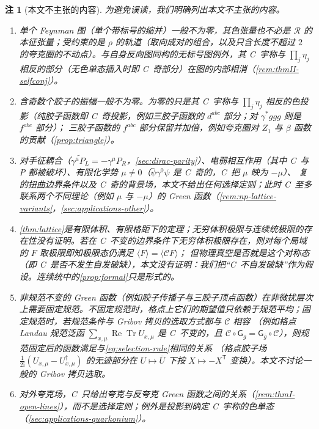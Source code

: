 \documentclass[UTF8,a4paper,11pt,fontset=fandol]{ctexart}
\theoremstyle{cplain}
\theoremstyle{cdefinition}
\theoremstyle{cremark}
\newtheorem{remark}[theorem]{注}
\numberwithin{equation}{section}
\DeclareMathOperator{\Tr}{Tr}
\DeclareMathOperator{\Real}{Re}
\newcommand{\tp}{\mathsf{T}}                         %
\newcommand{\Cop}{\mathcal{C}}                       %
\newcommand{\Rop}{\mathcal{R}}                       %
\newcommand{\ii}{\mathrm{i}}                        %
\newcommand{\Cconj}[1]{\widetilde{#1}}              %
\begin{document}
\begin{remark}[本文不主张的内容]\label{rem:np-nonclaims}
为避免误读，我们明确列出本文\emph{不}主张的内容。
\begin{enumerate}[label=(\arabic*),leftmargin=1.9em,itemsep=1pt,topsep=2pt]
\item 单个 Feynman 图（单个带标号的缩并）一般不为零，其色张量也不必是 $\Rop$ 的本征张量；受约束的是 $\rho$ 的轨道（取向成对的组合，以及只含长度不超过 $2$ 的夸克圈的不动点）。与自身反向图同构的无标号图例外，其 C~宇称与 $\prod_j\eta_j$ 相反的部分（无色单态插入时即 C~奇部分）在图的内部相消（\cref{rem:thmII-selfconj}）。
\item 含奇数个胶子的振幅一般不为零。为零的只是其 C~宇称与 $\prod_j\eta_j$ 相反的色投影（纯胶子函数即 C~奇投影，例如三胶子函数的 $d^{abc}$ 部分；对 $\gamma^*ggg$ 则是 $f^{abc}$ 部分）；
三胶子函数的 $f^{abc}$ 部分保留并加倍，例如夸克圈对 $Z_1$ 与 $\beta$ 函数的贡献（\cref{prop:triangle}）。
\item 对手征耦合（$\Cconj{\gamma^\mu P_L}=-\gamma^\mu P_R$，\cref{sec:dirac-parity}）、电弱相互作用（其中 C~与 P 都被破坏）、有限化学势 $\mu\neq0$（$\bar\psi\gamma^0\psi$ 是 C~奇的，C~把 $\mu$ 映为 $-\mu$）、
复的扭曲边界条件以及 C~奇的背景场，本文不给出任何选择定则；此时 C~至多联系两个不同理论（例如 $\mu$ 与 $-\mu$）的 Green 函数（\cref{rem:np-lattice-variants}，\cref{sec:applications-other}）。
\item \cref{thm:lattice}是有限体积、有限格距下的定理；无穷体积极限与连续统极限的存在性没有证明。若在 C~不变的边界条件下无穷体积极限存在，则对每个局域的 $F$ 取极限即知极限态仍满足 $\langle F\rangle=\langle\Cop F\rangle$；
但物理真空是否就是这个对称态（即 C~是否不发生自发破缺），本文没有证明：我们把“C~不自发破缺”作为\emph{假设}。连续统中的\cref{prop:formal}只是形式的。
\item 非规范不变的 Green 函数（例如胶子传播子与三胶子顶点函数）在非微扰层次上需要固定规范。不固定规范时，格点上它们的期望值只依赖于规范平均；固定规范时，若规范条件与 Gribov 拷贝的选取方式都与 $\Cop$ 相容
（例如格点 Landau 规范泛函 $\sum_{x,\mu}\Real\Tr U_{x,\mu}$ 是 C~不变的，且 $\Cop\circ\mathsf G_g=\mathsf G_{\overline g}\circ\Cop$），则规范固定后的函数满足与\cref{eq:selection-rule}相同的关系
（格点胶子场 $\frac1{2\ii}(U_{x,\mu}-U_{x,\mu}^\dagger)$ 的无迹部分在 $U\mapsto\overline U$ 下按 $X\mapsto-X^{\tp}$ 变换）。本文不讨论一般的 Gribov 拷贝选取。
\item 对外夸克场，C~只给出夸克与反夸克 Green 函数之间的关系（\cref{rem:thmI-open-lines}），而不是选择定则；例外是投影到确定 C~宇称的色单态（\cref{sec:applications-quarkonium}）。
\end{enumerate}
\end{remark}
\end{document}
